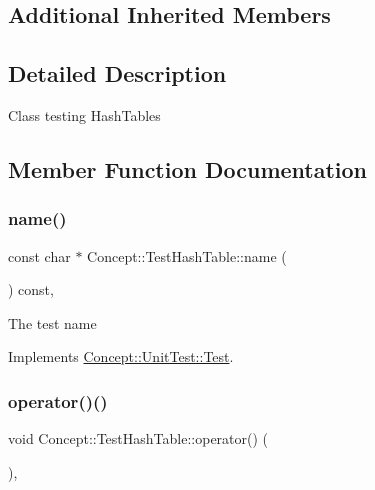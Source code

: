 \subsection*{Additional Inherited Members}


\subsection{Detailed Description}
Class testing Hash\+Tables 

\subsection{Member Function Documentation}
\mbox{\label{class_concept_1_1_test_hash_table_ace0c357ea2d8dbd2cc7d7d8dae9e35ec}} 
\subsubsection{\texorpdfstring{name()}{name()}}
{\footnotesize\ttfamily const char $\ast$ Concept\+::\+Test\+Hash\+Table\+::name (\begin{DoxyParamCaption}{ }\end{DoxyParamCaption}) const\hspace{0.3cm}{\ttfamily [override]}, {\ttfamily [virtual]}}

The test name 

Implements \mbox{\hyperlink{class_concept_1_1_unit_test_1_1_test_a28c0cddd9719cd456fa92a142ae6c59d}{Concept\+::\+Unit\+Test\+::\+Test}}.

\mbox{\label{class_concept_1_1_test_hash_table_a64943226aff8a1ac3f3d1b875159bdfe}} 
\subsubsection{\texorpdfstring{operator()()}{operator()()}}
{\footnotesize\ttfamily void Concept\+::\+Test\+Hash\+Table\+::operator() (\begin{DoxyParamCaption}{ }\end{DoxyParamCaption})\hspace{0.3cm}{\ttfamily [override]}, {\ttfamily [virtual]}}

